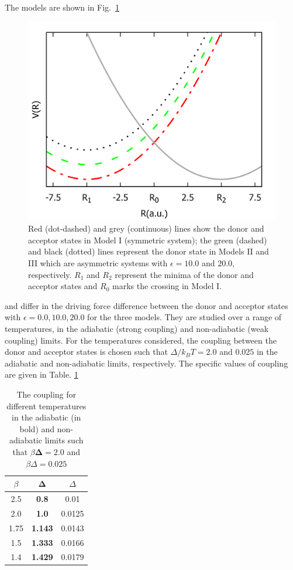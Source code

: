 \documentclass[%
 aip,
 jmp,%
 amsmath,amssymb,
reprint,%
]{revtex4-1}
\begin{document}
The models are shown in Fig.~\ref{fig:DApot}
\begin{figure}[h!]
\centering
\includegraphics[scale=0.16]{model-pot-6.png}%
\caption{Red (dot-dashed) and grey (continuous) lines show the donor and acceptor states in Model I (symmetric system); the green (dashed) and black (dotted) lines represent the donor state in Models II and III which are asymmetric systems with $\epsilon=10.0$ and $20.0$, respectively. $R_{1}$ and $R_{2}$ represent the minima of the donor and acceptor states and $R_{0}$ marks the crossing in Model I.} \label{fig:DApot}
\end{figure}
and differ in the driving force difference between the donor and acceptor states with $\epsilon=0.0,10.0,20.0$ for the three models. They are studied over a range of temperatures, in the adiabatic (strong coupling) and non-adiabatic (weak coupling) limits. For the temperatures considered, the coupling between the donor and acceptor states is chosen such that $\Delta/k_{B}T=2.0$ and $0.025$ in the adiabatic and non-adiabatic limits, respectively. The specific values of coupling are given in Table. \ref{CouplingTable}
\\
\begin{table}[ht!]
\renewcommand{\arraystretch}{1.25}
\begin{tabular}{|c|c|c|} \hline
$\beta$& $ \mathbf{\Delta} $ & $\Delta$ \\ \hline %
2.5 & \textbf{0.8}  & 0.01 \\ %
2.0 & \textbf{1.0} & 0.0125\\ %
1.75 & \textbf{1.143}  & 0.0143 \\ %
1.5 & \textbf{1.333} & 0.0166 \\ %
1.4 & \textbf{1.429} & 0.0179\\ \hline
\end{tabular}
\caption{The coupling for different temperatures in the adiabatic (in bold) and non-adiabatic limits such that $\beta\mathbf{\Delta}=2.0$ and $\beta\Delta = 0.025$} \label{CouplingTable}
\renewcommand{\arraystretch}{1}
\end{table}
\end{document}
